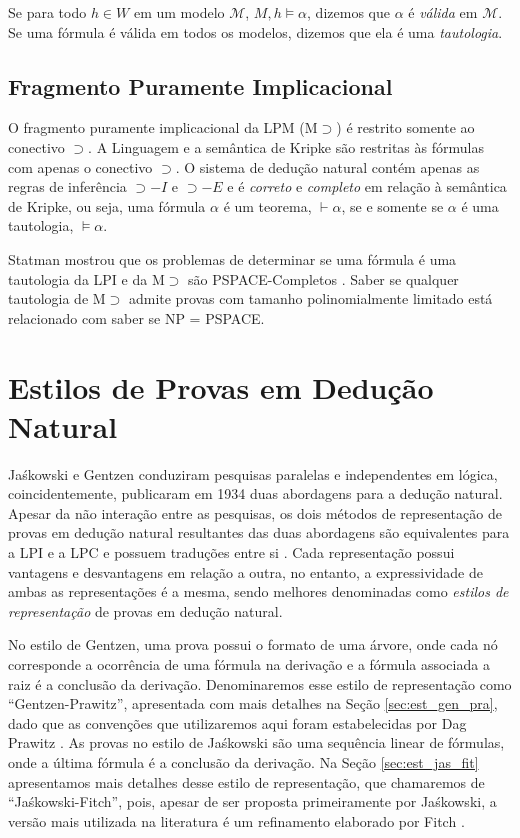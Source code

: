 Se para todo $h \in W$ em um modelo $\mathcal{M}$, $M, h \vDash \alpha$, dizemos que $\alpha$ é \textit{válida} em $\mathcal{M}$. Se uma fórmula é válida em todos os modelos, dizemos que ela é uma \textit{tautologia}. 

\subsection{Fragmento Puramente Implicacional}

O fragmento puramente implicacional da LPM (M$\supset$) é restrito somente ao conectivo $\supset$. A Linguagem e a semântica de Kripke são restritas às fórmulas com apenas o conectivo $\supset$. O sistema de dedução natural contém apenas as regras de inferência $\supset{-I}$ e $\supset{-E}$ e é \textit{correto} e \textit{completo} em relação à semântica de Kripke, ou seja, uma fórmula $\alpha$ é um teorema, $\vdash \alpha$, se e somente se $\alpha$ é uma tautologia, $\vDash \alpha$.

Statman mostrou que os problemas de determinar se uma fórmula é uma tautologia da LPI e da M$\supset$ são PSPACE-Completos \cite{STATMAN197967}. Saber se qualquer tautologia de M$\supset$ admite provas com tamanho polinomialmente limitado está relacionado com saber se NP = PSPACE.

\section{Estilos de Provas em Dedução Natural}
\label{sec:estilos_prova}

Ja{\'s}kowski e Gentzen conduziram pesquisas paralelas e independentes em lógica, coincidentemente, publicaram em 1934 duas abordagens para a dedução natural. Apesar da não interação entre as pesquisas, os dois métodos de representação de provas em dedução natural resultantes das duas abordagens são equivalentes para a LPI e a LPC \cite{Hazen2014} e possuem traduções entre si \cite{Standefer2018}. Cada representação possui vantagens e desvantagens em relação a outra, no entanto, a expressividade de ambas as representações é a mesma, sendo melhores denominadas como \textit{estilos de representação} de provas em dedução natural. 

No estilo de Gentzen, uma prova possui o formato de uma árvore, onde cada nó corresponde a ocorrência de uma fórmula na derivação e a fórmula associada a raiz é a conclusão da derivação. Denominaremos esse estilo de representação como ``Gentzen-Prawitz'', apresentada com mais detalhes na Seção \ref{sec:est_gen_pra}, dado que as convenções que utilizaremos aqui foram estabelecidas por Dag Prawitz \cite{Prawitz1965}. As provas no estilo de Ja{\'s}kowski são uma sequência linear de fórmulas, onde a última fórmula é a conclusão da derivação. Na Seção \ref{sec:est_jas_fit} apresentamos mais detalhes desse estilo de representação, que chamaremos de ``Ja{\'s}kowski-Fitch'', pois, apesar de ser proposta primeiramente por Ja{\'s}kowski, a versão mais utilizada na literatura é um refinamento elaborado por Fitch \cite{Fitch195}.

